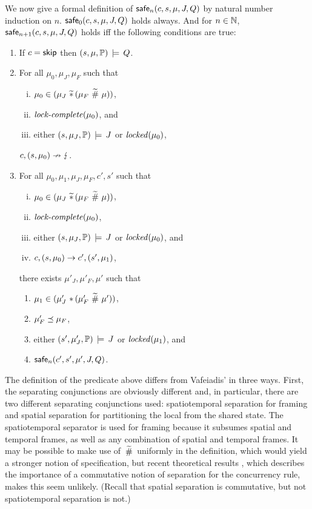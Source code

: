 \documentclass[11pt]{report}         %
\begin{document}
We now give a formal definition of $\mathsf{safe}_{n}(c,s,\mu,J,Q)$ by natural number induction on $n$. $\mathsf{safe}_{0}(c,s,\mu,J,Q)$ holds always. And for $n \in \mathbb{N}$, $\mathsf{safe}_{n+1}(c,s,\mu,J,Q)$ holds iff the following conditions are true: \begin{enumerate}
  \item If $c = \operatorname{\mathsf{skip}}$ then $(s,\mu,\mathbb{P}) \,\models\, Q$.

  \item For all $\mu_0,\mu_J,\mu_F$ such that \begin{enumerate}[(i)]
    \item $\mu_0 \in (\mu_J \operatorname{\,\widetilde{\ast}\,} (\mu_F \operatorname{\,\widetilde{\#}\,} \mu))$,
    \item $\text{\textit{lock-complete}}(\mu_0)$, and
    \item either $(s,\mu_J,\mathbb{P}) \,\models\, J$ or $\mathit{locked}(\mu_0)$,
  \end{enumerate} $c,(s,\mu_0) \nrightarrow \lightning$.

  \item For all $\mu_0,\mu_1,\mu_J,\mu_F,c',s'$ such that \begin{enumerate}[(i)]
    \item $\mu_0 \in (\mu_J \operatorname{\,\widetilde{\ast}\,} (\mu_F \operatorname{\,\widetilde{\#}\,} \mu))$,
    \item $\text{\textit{lock-complete}}(\mu_0)$,
    \item either $(s,\mu_J,\mathbb{P}) \,\models\, J$ or $\mathit{locked}(\mu_0)$, and 
    \item $c,(s,\mu_0) \rightarrow c',(s',\mu_1)$,
  \end{enumerate} there exists $\mu'_J,\mu'_F,\mu'$ such that \begin{enumerate}
    \item $\mu_1 \in (\mu'_J \operatorname{\,\ast\,} (\mu'_F \operatorname{\,\widetilde{\#}\,} \mu'))$,
    \item $\mu'_F \preceq \mu_F$,
    \item either $(s',\mu'_J,\mathbb{P}) \,\models\, J$ or $\mathit{locked}(\mu_1)$, and
    \item $\mathsf{safe}_{n}(c',s',\mu',J,Q)$.
  \end{enumerate}

\end{enumerate}

The definition of the predicate above differs from Vafeiadis' in three ways. First, the separating conjunctions are obviously different and, in particular, there are two different separating conjunctions used: spatiotemporal separation for framing and spatial separation for partitioning the local from the shared state. The spatiotemporal separator is used for framing because it subsumes spatial and temporal frames, as well as any combination of spatial and temporal frames. It may be possible to make use of $\operatorname{\,\widetilde{\#}\,}$ uniformly in the definition, which would yield a stronger notion of specification, but recent theoretical results \cite{DBLP:conf/concur/HoareHMOPS11}, which describes the importance of a commutative notion of separation for the concurrency rule, makes this seem unlikely. (Recall that spatial separation is commutative, but not spatiotemporal separation is not.)
\end{document}
